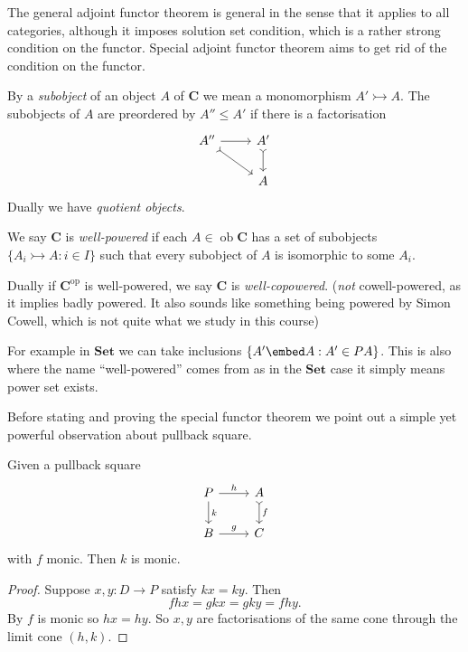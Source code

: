\documentclass[a4paper]{article}
\renewcommand{\c}[1]{\mathbf{#1}}
\DeclareMathOperator{\ob}{ob}
\newcommand{\Set}{{\c{Set}}}
\newcommand{\mono}{\rightarrowtail}
\begin{document}
The general adjoint functor theorem is general in the sense that it applies to all categories, although it imposes solution set condition, which is a rather strong condition on the functor. Special adjoint functor theorem aims to get rid of the condition on the functor.

\begin{definition}
  By a \emph{subobject} of an object \(A\) of \(\c C\) we mean a monomorphism \(A' \mono A\). The subobjects of \(A\) are preordered by \(A'' \leq A'\) if there is a factorisation
  \[
    \begin{tikzcd}
      A'' \ar[r] \ar[dr, tail] & A' \ar[d, tail] \\
      & A
    \end{tikzcd}
  \]
  Dually we have \emph{quotient objects}.
\end{definition}

\begin{definition}
  We say \(\c C\) is \emph{well-powered} if each \(A \in \ob \c C\) has a set of subobjects \(\{A_i \mono A: i \in I\}\) such that every subobject of \(A\) is isomorphic to some \(A_i\).

  Dually if \(\c C^{\text{op}}\) is well-powered, we say \(\c C\) is \emph{well-copowered}. (\emph{not} cowell-powered, as it implies badly powered. It also sounds like something being powered by Simon Cowell, which is not quite what we study in this course)
\end{definition}

For example in \(\Set\) we can take inclusions \(\{A' \embed A: A ' \in PA\}\). This is also where the name ``well-powered'' comes from as in the \(\Set\) case it simply means power set exists.

Before stating and proving the special functor theorem we point out a simple yet powerful observation about pullback square.

\begin{lemma}
  Given a pullback square
  \[
    \begin{tikzcd}
      P \ar[r, "h"] \ar[d, "k"] & A \ar[d, "f", tail] \\
      B \ar[r, "g"] & C
    \end{tikzcd}
  \]
  with \(f\) monic. Then \(k\) is monic.
\end{lemma}

\begin{proof}
  Suppose \(x, y: D \to P\) satisfy \(kx = ky\). Then
  \[
    fhx = gkx = gky = fhy.
  \]
  By \(f\) is monic so \(hx = hy\). So \(x, y\) are factorisations of the same cone through the limit cone \((h, k)\).
\end{proof}
\end{document}
